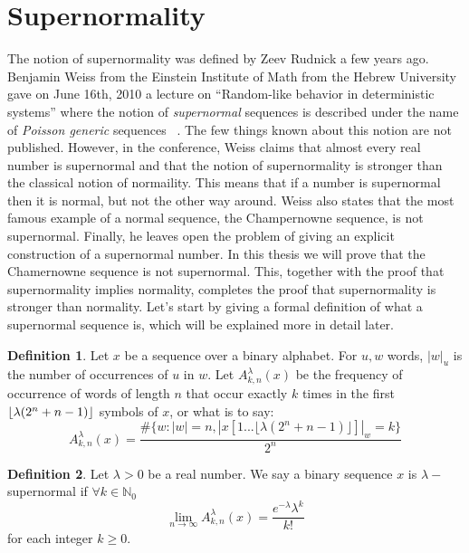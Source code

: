 \documentclass[11pt,a4paper]{tesis}
\theoremstyle{definition}
\newtheorem{definition}{Definition}[section]
\DeclarePairedDelimiter{\floor}{\lfloor}{\rfloor}
\begin{document}
\section{Supernormality}

    

The notion of supernormality was defined by Zeev Rudnick a few years ago. Benjamin Weiss from the Einstein Institute of Math from the Hebrew University gave on June 16th, 2010 a lecture on “Random-like behavior in deterministic systems”  where the notion of \textit{supernormal} sequences is described under the name of \textit{Poisson generic} sequences ~\cite{Weiss}.
 The few things known about this notion are not published. However, in the conference, Weiss claims that almost every real number is supernormal and that the notion of supernormality is stronger than the classical notion of normaility. This means that if a number is supernormal then it is normal, but not the other way around. 
Weiss also states that the most famous example of a normal sequence, the Champernowne sequence, is not supernormal.
Finally, he leaves open the problem of giving an explicit construction of a supernormal number.
In this thesis we will prove that the Chamernowne sequence is not supernormal. This, together with the proof that supernormality implies normality, completes the proof that supernormality is stronger than normality.
Let's start by giving a formal definition of what a supernormal sequence is, which will be explained more in detail later.
\\


\begin{definition}
Let $x$ be a sequence over a binary alphabet.
For $u,w$ words, $|w|_u$ is the number of occurrences of $u$ in $w$.
Let $A^\lambda_{k,n}(x)$ be the frequency of occurrence of words of length $n$ that occur exactly $k$ times in the first $\floor{\lambda(2^n+n-1)}$ symbols of $x$, or what is to say:
$$A^\lambda_{k,n}(x) = \frac{\#\{w: |w| = n  , |x[1...\lfloor\lambda(2^n+n-1)\rfloor]|_w = k\}}{2^n}$$
\end{definition}


\begin{definition}
    Let $\lambda > 0$ be a real number. We say a binary sequence $x$ is $\lambda-$supernormal if $\forall k \in \mathds{N}_{0}$ $$\lim_{n\to\infty} A^\lambda_{k,n}(x) = \frac{e^{-\lambda}\lambda^k}{k!}$$ for each integer $k \geq 0$.
\end{definition}
\end{document}
